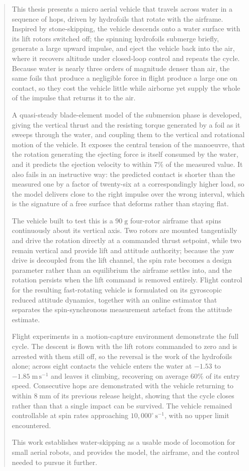 \begin{abstract}

This thesis presents a micro aerial vehicle that travels across water in a
sequence of hops, driven by hydrofoils that rotate with the airframe. Inspired
by stone-skipping, the vehicle descends onto a water surface with its lift
rotors switched off; the spinning hydrofoils submerge briefly, generate a large
upward impulse, and eject the vehicle back into the air, where it recovers
altitude under closed-loop control and repeats the cycle. Because water is
nearly three orders of magnitude denser than air, the same foils that produce a
negligible force in flight produce a large one on contact, so they cost the
vehicle little while airborne yet supply the whole of the impulse that returns
it to the air.

A quasi-steady blade-element model of the submersion phase is developed, giving
the vertical thrust and the resisting torque generated by a foil as it sweeps
through the water, and coupling them to the vertical and rotational motion of
the vehicle. It exposes the central tension of the manoeuvre, that the rotation
generating the ejecting force is itself consumed by the water, and it predicts
the ejection velocity to within $7\%$ of the measured value. It also fails in
an instructive way: the predicted contact is shorter than the measured one by a
factor of twenty-six at a correspondingly higher load, so the model delivers
close to the right impulse over the wrong interval, which is the signature of a
free surface that deforms rather than staying flat.

The vehicle built to test this is a $90\;\mathrm{g}$ four-rotor airframe that
spins continuously about its vertical axis. Two rotors are mounted
tangentially and drive the rotation directly at a commanded thrust setpoint,
while two remain vertical and provide lift and attitude authority; because the
yaw drive is decoupled from the lift channel, the spin rate becomes a design
parameter rather than an equilibrium the airframe settles into, and the
rotation persists when the lift command is removed entirely. Flight control
for the resulting fast-rotating vehicle is formulated on its gyroscopic reduced
attitude dynamics, together with an online estimator that separates the
spin-synchronous measurement artefact from the attitude estimate.

Flight experiments in a motion-capture environment demonstrate the full cycle.
The descent is flown with the lift rotors commanded to zero and is arrested
with them still off, so the reversal is the work of the hydrofoils alone;
across eight contacts the vehicle enters the water at $-1.53$ to
$-1.85\;\mathrm{m\,s^{-1}}$ and leaves it climbing, recovering on average
$60\%$ of its entry speed. Consecutive hops are demonstrated with the vehicle
returning to within $8\;\mathrm{mm}$ of its previous release height, showing
that the cycle closes rather than that a single impact can be survived. The
vehicle remained controllable at spin rates approaching
$10{,}000^{\circ}\,\mathrm{s^{-1}}$, with no upper limit encountered.

This work establishes water-skipping as a usable mode of locomotion for small
aerial robots, and provides the model, the airframe, and the control needed to
pursue it further.

\end{abstract}
